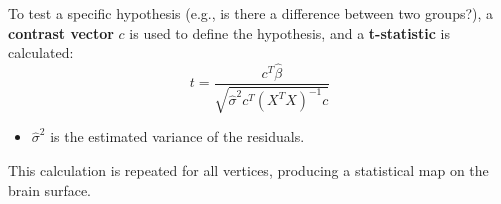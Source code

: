 \documentclass[12pt]{article}
\begin{document}
To test a specific hypothesis (e.g., is there a difference between two groups?), a \textbf{contrast vector} $c$ is used to define the hypothesis, and a \textbf{t-statistic} is calculated:
\begin{equation}
t = \frac{c^T \hat{\beta}}{\sqrt{\hat{\sigma}^2 c^T (X^T X)^{-1} c}}
\end{equation}
\begin{itemize}
    \item $\hat{\sigma}^2$ is the estimated variance of the residuals.
\end{itemize}
This calculation is repeated for all vertices, producing a statistical map on the brain surface.
\end{document}
